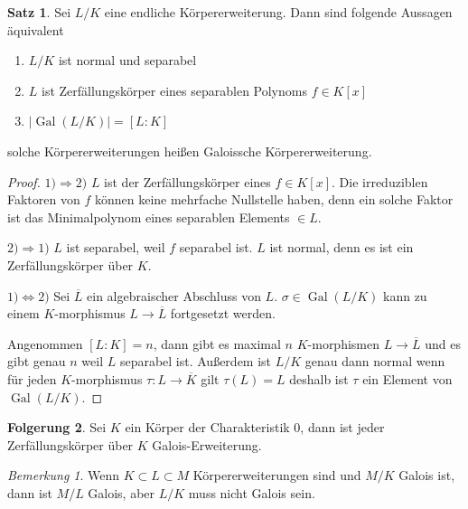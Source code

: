 \documentclass[12pt,parskip=full]{scrartcl}
\newcommand{\abs}[1]{{\left| #1 \right|}}
\newcommand{\heading}{\underline}
\DeclareMathOperator{\Gal}{Gal}
\theoremstyle{definition}
\newtheorem{theorem}{Satz}[section]
\newtheorem{corollary}[theorem]{Folgerung}
\theoremstyle{remark}
\newtheorem*{remark}{Bemerkung}
\begin{document}
	\begin{theorem}
		Sei $L/K$ eine endliche Körpererweiterung. Dann sind folgende Aussagen äquivalent
		\begin{enumerate}
			\item $L/K$ ist normal und separabel
			\item $L$ ist Zerfällungskörper eines separablen Polynoms $f \in K[x]$
			\item $\abs{\Gal(L/K)} = [L:K]$
		\end{enumerate}
		solche Körpererweiterungen heißen Galoissche Körpererweiterung.
	\end{theorem}

	\begin{proof}
		\heading{$1) \Rightarrow 2)$} $L$ ist der Zerfällungskörper eines $f \in K[x]$. Die irreduziblen Faktoren von $f$ können keine mehrfache Nullstelle haben, denn ein solche Faktor ist das Minimalpolynom eines separablen Elements $\in L$.
		
		\heading{$2) \Rightarrow 1)$} $L$ ist separabel, weil $f$ separabel ist. $L$ ist normal, denn es ist ein Zerfällungskörper über $K$.
		
		\heading{$1) \Leftrightarrow 2)$} Sei $\overline{L}$ ein algebraischer Abschluss von $L$. $\sigma \in \Gal(L/K)$ kann zu einem $K$-morphismus $L \to \overline{L}$ fortgesetzt werden.
		
		Angenommen $[L:K] = n$, dann gibt es maximal $n$ $K$-morphismen $L \to \overline{L}$ und es gibt genau $n$ weil $L$ separabel ist. Außerdem ist $L/K$ genau dann normal wenn für jeden $K$-morphismus $\tau: L \to \overline{K}$ gilt $\tau(L) = L$ deshalb ist $\tau$ ein Element von $\Gal(L/K)$.
	\end{proof}

	\begin{corollary}
		Sei $K$ ein Körper der Charakteristik $0$, dann ist jeder Zerfällungskörper über $K$ Galois-Erweiterung.
	\end{corollary}

	\begin{remark}
		Wenn $K \subset L \subset M$ Körpererweiterungen sind und $M/K$ Galois ist, dann ist $M/L$ Galois, aber $L/K$ muss nicht Galois sein.
	\end{remark}
\end{document}
